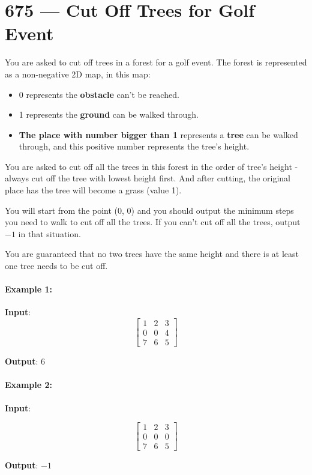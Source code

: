 \section{675 --- Cut Off Trees for Golf Event}
You are asked to cut off trees in a forest for a golf event. The forest is represented as a non-negative 2D map, in this map:

\begin{itemize}
\item 0 represents the \textbf{obstacle} can't be reached.
\item 1 represents the \textbf{ground} can be walked through.
\item \textbf{The place with number bigger than 1} represents a \textbf{tree} can be walked through, and this positive number represents the tree's height.
\end{itemize}
 

You are asked to cut off all the trees in this forest in the order of tree's height - always cut off the tree with lowest height first. And after cutting, the original place has the tree will become a grass (value 1).

You will start from the point (0, 0) and you should output the minimum steps you need to walk to cut off all the trees. If you can't cut off all the trees, output $-1$ in that situation.

You are guaranteed that no two trees have the same height and there is at least one tree needs to be cut off.

\paragraph{Example 1:}

\begin{flushleft}
\textbf{Input}:
\[
\begin{bmatrix}
1 & 2 & 3\\
0 & 0 & 4\\
7 & 6 & 5
\end{bmatrix}
\] 

\textbf{Output}: 6

\end{flushleft}
 

\paragraph{Example 2:}
\begin{flushleft}

\textbf{Input}: 

\[
\begin{bmatrix}
1 & 2 & 3\\
0 & 0 & 0\\
7 & 6 & 5
\end{bmatrix}
\] 

\textbf{Output}: $-1$
 

\end{flushleft}


